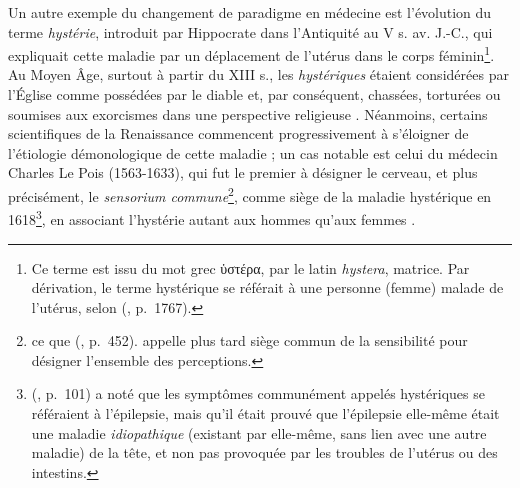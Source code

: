 \label{hysterie} Un autre exemple du changement de paradigme en médecine est l'évolution du terme \textit{hystérie}, introduit par Hippocrate dans l'Antiquité au V\ieme{} s. av. J.-C., qui expliquait cette maladie par un déplacement de l'utérus dans le corps féminin\footnote{Ce terme est issu du mot grec \foreignlanguage{greek}{ὑστέρα}, par le latin \textit{hystera}, \og{}matrice\fg{}. Par dérivation, le terme \og{}hystérique\fg{} se référait à une personne \og{}(femme) malade de l'utérus\fg{}, selon \citeauthor{rey2011dictionnaire} (\citeyear{rey2011dictionnaire}, p.~1767).}. Au Moyen Âge, surtout à partir du XIII\ieme{} s., les \textit{hystériques} étaient considérées par l'Église comme possédées par le diable et, par conséquent, chassées, torturées ou soumises aux exorcismes dans une perspective religieuse \citep[p.~113]{tasca2012women}. Néanmoins, certains scientifiques de la Renaissance commencent progressivement à s'éloigner de l'étiologie démonologique de cette maladie ; un cas notable est celui du médecin Charles Le Pois (1563-1633), qui fut le premier à désigner le cerveau, et plus précisément, le \textit{sensorium commune}\footnote{ce que \citeauthor{kant1863} (\citeyear{kant1863}, p.~452). appelle plus tard \og{}siège commun de la sensibilité\fg{} pour désigner l'ensemble des perceptions.}, comme siège de la maladie hystérique en 1618\footnote{\citeauthor{lepois1618} (\citeyear{lepois1618}, p.~101) a noté que les symptômes communément appelés hystériques se référaient à l'épilepsie, mais qu'il était prouvé que l'épilepsie elle-même était une maladie \textit{idiopathique} (existant par elle-même, sans lien avec une autre maladie) de la tête, et non pas provoquée par les troubles de l'utérus ou des intestins.}, en associant l'hystérie autant aux hommes qu'aux femmes \citep[p.~235]{wright1980}.  

